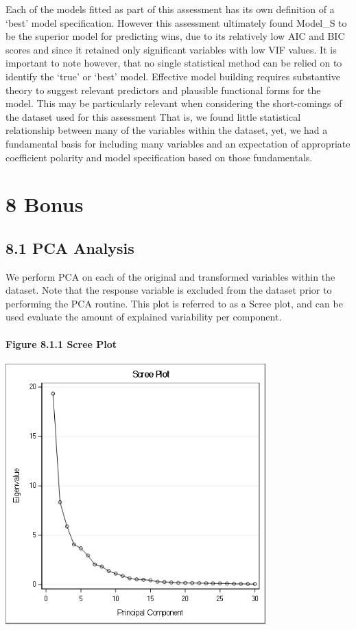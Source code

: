 \documentclass[]{article}
\let\oldparagraph\paragraph
\renewcommand{\paragraph}[1]{\oldparagraph{#1}\mbox{}}
\begin{document}
Each of the models fitted as part of this assessment has its own
definition of a `best' model specification. However this assessment
ultimately found Model\_S to be the superior model for predicting wins,
due to its relatively low AIC and BIC scores and since it retained only
significant variables with low VIF values. It is important to note
however, that no single statistical method can be relied on to identify
the `true' or `best' model. Effective model building requires
substantive theory to suggest relevant predictors and plausible
functional forms for the model. This may be particularly relevant when
considering the short-comings of the dataset used for this assessment
That is, we found little statistical relationship between many of the
variables within the dataset, yet, we had a fundamental basis for
including many variables and an expectation of appropriate coefficient
polarity and model specification based on those fundamentals.

\section{8 Bonus}\label{bonus}

\subsection{8.1 PCA Analysis}\label{pca-analysis}

We perform PCA on each of the original and transformed variables within
the dataset. Note that the response variable is excluded from the
dataset prior to performing the PCA routine. This plot is referred to as
a Scree plot, and can be used evaluate the amount of explained
variability per component.

\paragraph{Figure 8.1.1 Scree Plot}\label{figure-8.1.1-scree-plot}

\includegraphics[height=3.95833in]{images/scree.png}
\end{document}
